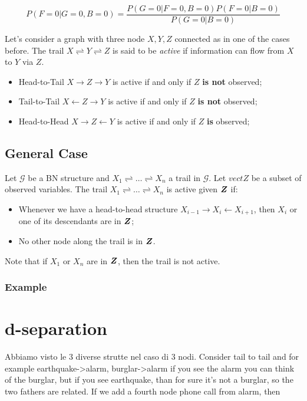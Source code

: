 \[P(F=0\vert G=0, B=0)=\dfrac{P(G=0\vert F=0,B=0)P(F=0\vert B=0)}{P(G=0\vert B=0)}\]
\begin{definition}
  Let's consider a graph with three node $X,Y,Z$ connected as in one of the cases before. The trail $X\rightleftharpoons Y\rightleftharpoons Z$ is said to be \textit{active} if information can flow from $X$ to $Y$ via $Z$.
  \begin{itemize}
    \item Head-to-Tail $X\rightarrow Z\rightarrow Y$ is active if and only if $Z$ \textbf{is not} observed;
    \item Tail-to-Tail $X\leftarrow Z\rightarrow Y$ is active if and only if $Z$ \textbf{is not} observed;
    \item Head-to-Head $X\rightarrow Z\leftarrow Y$ is active if and only if $Z$ \textbf{is} observed;
  \end{itemize}
\end{definition}
%
%
\subsection{General Case}
\begin{definition}
  Let $\mathcal{G}$ be a BN structure and $X_1\rightleftharpoons\hdots\rightleftharpoons X_n$ a trail in $\mathcal{G}$. Let $vect{Z}$ be a subset of observed variables. The trail $X_1\rightleftharpoons\hdots\rightleftharpoons X_n$ is active given $\bm{Z}$ if:
  \begin{itemize}
    \item Whenever we have a head-to-head structure $X_{i-1}\rightarrow X_i\leftarrow X_{i+1}$, then $X_i$ or one of its descendants are in $\bm{Z}$;
    \item No other node along the trail is in $\bm{Z}$.
  \end{itemize}
\end{definition}
Note that if $X_1$ or $X_n$ are in $\bm{Z}$, then the trail is not active. 
%
\subsubsection{Example}


\section{d-separation}
Abbiamo visto le 3 diverse strutte nel caso di 3 nodi. Consider tail to tail and for example earthquake->alarm, burglar->alarm if you see the alarm you can think of the burglar, but if you see earthquake, than for sure it's not a burglar, so the two fathers are related. \newline
If we add a fourth node phone call from alarm, then
